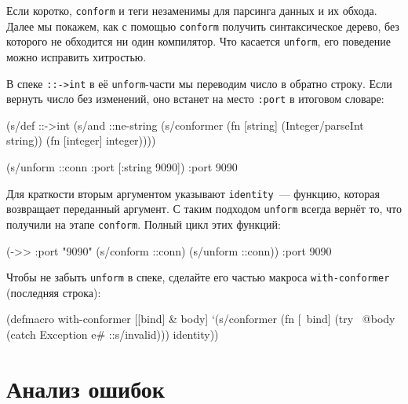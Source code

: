 Если коротко, \verb|conform| и теги незаменимы для парсинга данных и их
обхода. Далее мы покажем, как с помощью \verb|conform| получить синтаксическое
дерево, без которого не обходится ни один компилятор. Что касается
\verb|unform|, его поведение можно исправить хитростью.

В спеке \verb|::->int| в её \verb|unform|-части мы переводим число в обратно
строку. Если вернуть число без изменений, оно встанет на место \verb|:port| в
итоговом словаре:

\begin{english}
  \begin{clojure}
(s/def ::->int
  (s/and
   ::ne-string
   (s/conformer
    (fn [string]
      (Integer/parseInt string))
    (fn [integer]
      integer))))

(s/unform ::conn {:port [:string 9090]})
{:port 9090}
  \end{clojure}
\end{english}


Для краткости вторым аргументом указывают \verb|identity|~--- функцию, которая
возвращает переданный аргумент. С таким подходом \verb|unform| всегда вернёт то,
что получили на этапе \verb|conform|. Полный цикл этих функций:

\begin{english}
  \begin{clojure}
(->> {:port "9090"}
     (s/conform ::conn)
     (s/unform ::conn))
{:port 9090}
  \end{clojure}
\end{english}

Чтобы не забыть \verb|unform| в спеке, сделайте его частью макроса
\verb|with-conformer| (последняя строка):

\begin{english}
  \begin{clojure}
(defmacro with-conformer
  [[bind] & body]
  `(s/conformer
    (fn [~bind]
      (try
        ~@body
        (catch Exception e#
          ::s/invalid)))
    identity))
  \end{clojure}
\end{english}

\section{Анализ ошибок}


\label{spec-explain}

